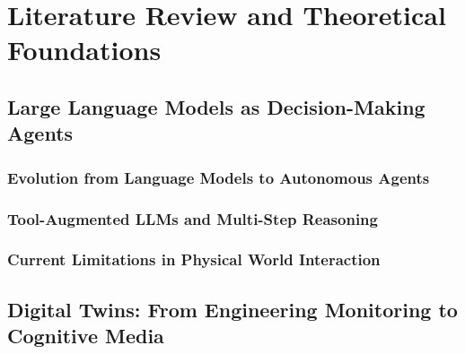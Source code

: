 
\chapter{Literature Review and Theoretical Foundations} \label{chp:literature}


\section{Large Language Models as Decision-Making Agents}

\subsection{Evolution from Language Models to Autonomous Agents}

\subsection{Tool-Augmented LLMs and Multi-Step Reasoning}

\subsection{Current Limitations in Physical World Interaction}

\section{Digital Twins: From Engineering Monitoring to Cognitive Media}

